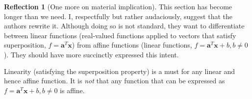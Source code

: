 \documentclass[11pt]{book}
\theoremstyle{definition}
\theoremstyle{plain}
\theoremstyle{problemstyle}
\theoremstyle{remark}
\renewcommand\qedsymbol{$\blacksquare$}
\theoremstyle{definition}
\newtheorem{reflection}{Reflection}
\begin{document}
\begin{reflection}[One more on material implication]
    This section has become longer than we need. I, respectfully but rather audaciously, suggest that the authors rewrite it. Although doing so is not standard, they want to differentiate between linear functions (real-valued functions applied to vectors that satisfy superposition, $f=\boldsymbol{a}^T\boldsymbol{x}$) from affine functions (linear functions, $f=\boldsymbol{a}^T\boldsymbol{x}+b, b\ne 0$). They should have more succinctly expressed this intent.

        Linearity (satisfying the superposition property) is a must for any linear and hence affine function. It is \emph{not} that any function that can be expressed as $f=\boldsymbol{a}^T\boldsymbol{x}+b, b\ne 0$ is affine. 

\end{reflection}
\end{document}
